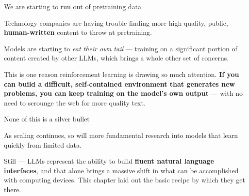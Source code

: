 \documentclass[aspectratio=169,11pt,t]{beamer}
\begin{document}
\begin{frame}[shrink=25]{We are starting to run out of pretraining data}
{\fontsize{9.4}{12.6}\selectfont\color{fg2}Technology companies are having trouble finding more high-quality, public, \textbf{human-written} content to throw at pretraining.\par}\vskip 4pt
\begin{iband}[rose]
Models are starting to \textit{eat their own tail} --- training on a significant portion of content created by other LLMs, which brings a whole other set of concerns.
\end{iband}
{\fontsize{9.4}{12.6}\selectfont\color{fg2}This is one reason reinforcement learning is drawing so much attention. \textbf{If you can build a difficult, self-contained environment that generates new problems, you can keep training on the model's own output} --- with no need to scrounge the web for more quality text.\par}\vskip 4pt
\end{frame}

\begin{frame}[shrink=25]{None of this is a silver bullet}
\begin{iquote}
\end{iquote}
{\fontsize{9.4}{12.6}\selectfont\color{fg2}As scaling continues, so will more fundamental research into models that learn quickly from limited data.\par}\vskip 4pt
{\fontsize{9.4}{12.6}\selectfont\color{fg2}Still --- LLMs represent the ability to build \textbf{fluent natural language interfaces}, and that alone brings a massive shift in what can be accomplished with computing devices. This chapter laid out the basic recipe by which they get there.\par}\vskip 4pt
\end{frame}
\end{document}
